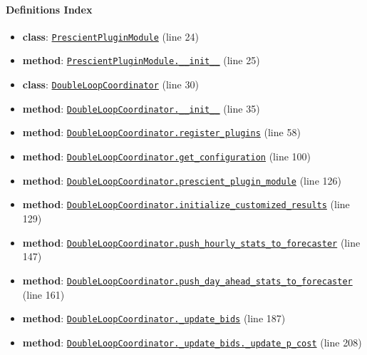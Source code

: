 \documentclass[11pt]{report}
\begin{document}
\paragraph{Definitions Index}
\begin{itemize}[leftmargin=*]
  \item \textbf{class}: \hyperref[def:coordinator.py:PrescientPluginModule:L24]{\texttt{PrescientPluginModule}} (line 24)
  \item \textbf{method}: \hyperref[def:coordinator.py:PrescientPluginModule.__init__:L25]{\texttt{PrescientPluginModule.\_\_init\_\_}} (line 25)
  \item \textbf{class}: \hyperref[def:coordinator.py:DoubleLoopCoordinator:L30]{\texttt{DoubleLoopCoordinator}} (line 30)
  \item \textbf{method}: \hyperref[def:coordinator.py:DoubleLoopCoordinator.__init__:L35]{\texttt{DoubleLoopCoordinator.\_\_init\_\_}} (line 35)
  \item \textbf{method}: \hyperref[def:coordinator.py:DoubleLoopCoordinator.register_plugins:L58]{\texttt{DoubleLoopCoordinator.register\_plugins}} (line 58)
  \item \textbf{method}: \hyperref[def:coordinator.py:DoubleLoopCoordinator.get_configuration:L100]{\texttt{DoubleLoopCoordinator.get\_configuration}} (line 100)
  \item \textbf{method}: \hyperref[def:coordinator.py:DoubleLoopCoordinator.prescient_plugin_module:L126]{\texttt{DoubleLoopCoordinator.prescient\_plugin\_module}} (line 126)
  \item \textbf{method}: \hyperref[def:coordinator.py:DoubleLoopCoordinator.initialize_customized_results:L129]{\texttt{DoubleLoopCoordinator.initialize\_customized\_results}} (line 129)
  \item \textbf{method}: \hyperref[def:coordinator.py:DoubleLoopCoordinator.push_hourly_stats_to_forecaster:L147]{\texttt{DoubleLoopCoordinator.push\_hourly\_stats\_to\_forecaster}} (line 147)
  \item \textbf{method}: \hyperref[def:coordinator.py:DoubleLoopCoordinator.push_day_ahead_stats_to_forecaster:L161]{\texttt{DoubleLoopCoordinator.push\_day\_ahead\_stats\_to\_forecaster}} (line 161)
  \item \textbf{method}: \hyperref[def:coordinator.py:DoubleLoopCoordinator._update_bids:L187]{\texttt{DoubleLoopCoordinator.\_update\_bids}} (line 187)
  \item \textbf{method}: \hyperref[def:coordinator.py:DoubleLoopCoordinator._update_bids._update_p_cost:L208]{\texttt{DoubleLoopCoordinator.\_update\_bids.\_update\_p\_cost}} (line 208)

\end{itemize}
\end{document}
